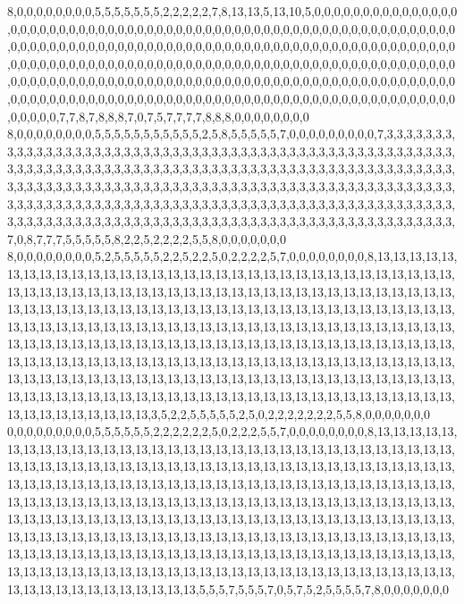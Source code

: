 8,0,0,0,0,0,0,0,0,5,5,5,5,5,5,5,2,2,2,2,2,7,8,13,13,5,13,10,5,0,0,0,0,0,0,0,0,0,0,0,0,0,0,0,0,0,0,0,0,0,0,0,0,0,0,0,0,0,0,0,0,0,0,0,0,0,0,0,0,0,0,0,0,0,0,0,0,0,0,0,0,0,0,0,0,0,0,0,0,0,0,0,0,0,0,0,0,0,0,0,0,0,0,0,0,0,0,0,0,0,0,0,0,0,0,0,0,0,0,0,0,0,0,0,0,0,0,0,0,0,0,0,0,0,0,0,0,0,0,0,0,0,0,0,0,0,0,0,0,0,0,0,0,0,0,0,0,0,0,0,0,0,0,0,0,0,0,0,0,0,0,0,0,0,0,0,0,0,0,0,0,0,0,0,0,0,0,0,0,0,0,0,0,0,0,0,0,0,0,0,0,0,0,0,0,0,0,0,0,0,0,0,0,0,0,0,0,0,0,0,0,0,0,0,0,0,0,0,0,0,0,0,0,0,0,0,0,0,0,0,0,0,0,0,0,0,0,0,0,0,0,0,0,0,0,0,0,0,0,0,0,0,0,0,0,0,0,0,0,0,0,0,0,0,0,0,0,0,0,7,7,8,7,8,8,8,7,0,7,5,7,7,7,7,8,8,8,0,0,0,0,0,0,0,0
8,0,0,0,0,0,0,0,0,5,5,5,5,5,5,5,5,5,5,5,2,5,8,5,5,5,5,5,7,0,0,0,0,0,0,0,0,0,7,3,3,3,3,3,3,3,3,3,3,3,3,3,3,3,3,3,3,3,3,3,3,3,3,3,3,3,3,3,3,3,3,3,3,3,3,3,3,3,3,3,3,3,3,3,3,3,3,3,3,3,3,3,3,3,3,3,3,3,3,3,3,3,3,3,3,3,3,3,3,3,3,3,3,3,3,3,3,3,3,3,3,3,3,3,3,3,3,3,3,3,3,3,3,3,3,3,3,3,3,3,3,3,3,3,3,3,3,3,3,3,3,3,3,3,3,3,3,3,3,3,3,3,3,3,3,3,3,3,3,3,3,3,3,3,3,3,3,3,3,3,3,3,3,3,3,3,3,3,3,3,3,3,3,3,3,3,3,3,3,3,3,3,3,3,3,3,3,3,3,3,3,3,3,3,3,3,3,3,3,3,3,3,3,3,3,3,3,3,3,3,3,3,3,3,3,3,3,3,3,3,3,3,3,3,3,3,3,3,3,3,3,3,3,3,3,3,3,3,3,3,3,3,3,3,3,3,3,3,3,3,3,3,3,3,3,3,7,0,8,7,7,7,5,5,5,5,5,8,2,2,5,2,2,2,2,5,5,8,0,0,0,0,0,0,0
8,0,0,0,0,0,0,0,0,5,2,5,5,5,5,5,2,2,5,2,2,5,0,2,2,2,2,5,7,0,0,0,0,0,0,0,0,8,13,13,13,13,13,13,13,13,13,13,13,13,13,13,13,13,13,13,13,13,13,13,13,13,13,13,13,13,13,13,13,13,13,13,13,13,13,13,13,13,13,13,13,13,13,13,13,13,13,13,13,13,13,13,13,13,13,13,13,13,13,13,13,13,13,13,13,13,13,13,13,13,13,13,13,13,13,13,13,13,13,13,13,13,13,13,13,13,13,13,13,13,13,13,13,13,13,13,13,13,13,13,13,13,13,13,13,13,13,13,13,13,13,13,13,13,13,13,13,13,13,13,13,13,13,13,13,13,13,13,13,13,13,13,13,13,13,13,13,13,13,13,13,13,13,13,13,13,13,13,13,13,13,13,13,13,13,13,13,13,13,13,13,13,13,13,13,13,13,13,13,13,13,13,13,13,13,13,13,13,13,13,13,13,13,13,13,13,13,13,13,13,13,13,13,13,13,13,13,13,13,13,13,13,13,13,13,13,13,13,13,13,13,13,13,13,13,13,13,13,13,13,13,13,13,13,13,13,13,13,13,13,13,13,13,13,13,13,3,5,2,2,5,5,5,5,5,2,5,0,2,2,2,2,2,2,2,5,5,8,0,0,0,0,0,0,0
0,0,0,0,0,0,0,0,0,5,5,5,5,5,5,2,2,2,2,2,2,5,0,2,2,2,5,5,7,0,0,0,0,0,0,0,0,8,13,13,13,13,13,13,13,13,13,13,13,13,13,13,13,13,13,13,13,13,13,13,13,13,13,13,13,13,13,13,13,13,13,13,13,13,13,13,13,13,13,13,13,13,13,13,13,13,13,13,13,13,13,13,13,13,13,13,13,13,13,13,13,13,13,13,13,13,13,13,13,13,13,13,13,13,13,13,13,13,13,13,13,13,13,13,13,13,13,13,13,13,13,13,13,13,13,13,13,13,13,13,13,13,13,13,13,13,13,13,13,13,13,13,13,13,13,13,13,13,13,13,13,13,13,13,13,13,13,13,13,13,13,13,13,13,13,13,13,13,13,13,13,13,13,13,13,13,13,13,13,13,13,13,13,13,13,13,13,13,13,13,13,13,13,13,13,13,13,13,13,13,13,13,13,13,13,13,13,13,13,13,13,13,13,13,13,13,13,13,13,13,13,13,13,13,13,13,13,13,13,13,13,13,13,13,13,13,13,13,13,13,13,13,13,13,13,13,13,13,13,13,13,13,13,13,13,13,13,13,13,13,13,13,13,13,13,13,13,13,13,5,5,5,7,5,5,5,7,0,5,7,5,2,5,5,5,5,7,8,0,0,0,0,0,0,0
